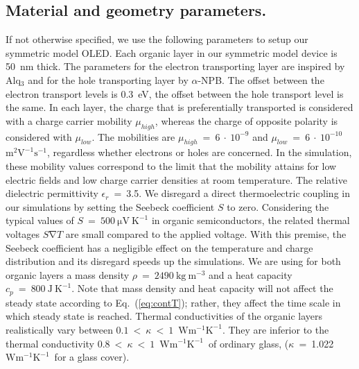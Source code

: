 \documentclass[%
9pt,
 aip,
rsi,%
 amsmath,amssymb,
preprint,%
]{revtex4-1}
\newcommand{\thermalconductivity}{$\mathrm{W m^{-1} K^{-1}}$}
\newcommand{\mobility}{$\mathrm{m^{2} V^{-1} s^{-1}}$}
\begin{document}
\subsection{Material and geometry parameters.}
If not otherwise specified, we use the following parameters to setup our symmetric model OLED.
Each organic layer in our symmetric model device is 50~nm thick. 
The parameters for the electron transporting layer are inspired by Alq$_3$ and for the hole transporting layer by $\alpha$-NPB.
The offset between the electron transport levels is 0.3~eV, the offset between the hole transport level is the same. 
In each layer, the charge that is preferentially transported is considered with a charge carrier mobility $\mu_{high}$, whereas the charge of opposite polarity is considered with $\mu_{low}$. 
The mobilities are $\mu_{high}~=~6~\cdot~10^{-9}$ and $\mu_{low}~=~6~\cdot~10^{-10}$~\mobility, regardless whether electrons or holes are concerned. 
In the simulation, these mobility values correspond to the limit that the mobility attains for low electric fields and low charge carrier densities at room temperature. 
The relative dielectric permittivity $\epsilon_r$~=~3.5.
We disregard a direct thermoelectric coupling in our simulations by setting the Seebeck coefficient $S$ to zero.
Considering the typical values of $S~=~500~\mathrm{\mu V~K^{-1}}$ in organic semiconductors, the related thermal voltages $S \mathrm{\nabla} T$ are small compared to the applied voltage.
With this premise, the Seebeck coefficient has a negligible effect on the temperature and charge distribution and its disregard speeds up the simulations. 
%
We are using for both organic layers a mass density $\rho~=~2490~\mathrm{kg~m^{-3}}$ and a heat capacity $c_p~=~800~\mathrm{J~K^{-1}}$.
Note that mass density and heat capacity will not affect the steady state according to Eq.~(\ref{eq:contT}); rather, they affect the time scale in which steady state is reached.
Thermal conductivities of the organic layers realistically vary\cite{Reisdorffer2014} between $0.1~<~\kappa~<~1$~\thermalconductivity. They are inferior to the thermal conductivity  $0.8~<~\kappa~<~1$~\thermalconductivity~of ordinary glass,  ($\kappa$~=~1.022~\thermalconductivity~for a glass cover).

\end{document}
